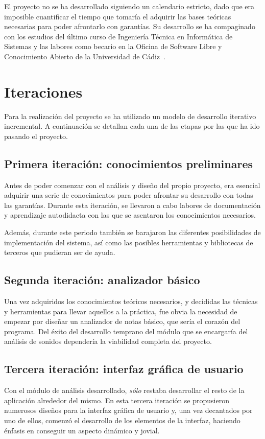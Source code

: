 El proyecto no se ha desarrollado siguiendo un calendario estricto,
dado que era imposible cuantificar el tiempo que tomaría el adquirir
las bases teóricas necesarias para poder afrontarlo con garantías. Su
desarrollo se ha compaginado con los estudios del último curso de
Ingeniería Técnica en Informática de Sistemas y las labores como
becario en la Oficina de Software Libre y Conocimiento Abierto de la
Universidad de Cádiz~\cite{osluca}.

\section{Iteraciones}
Para la realización del proyecto se ha utilizado un modelo de
desarrollo iterativo incremental. A continuación se detallan cada una
de las etapas por las que ha ido pasando el proyecto.

\subsection{Primera iteración: conocimientos preliminares}
Antes de poder comenzar con el análisis y diseño del propio proyecto,
era esencial adquirir una serie de conocimientos para poder afrontar
su desarrollo con todas las garantías. Durante esta iteración, se
llevaron a cabo labores de documentación y aprendizaje autodidacta con
las que se asentaron los conocimientos necesarios.

Además, durante este periodo también se barajaron las diferentes
posibilidades de implementación del sistema, así como las posibles
herramientas y bibliotecas de terceros que pudieran ser de ayuda.

\subsection{Segunda iteración: analizador básico}
Una vez adquiridos los conocimientos teóricos necesarios, y decididas
las técnicas y herramientas para llevar aquellos a la práctica, fue
obvia la necesidad de empezar por diseñar un analizador de notas
básico, que sería el corazón del programa. Del éxito del desarrollo
temprano del módulo que se encargaría del análisis de sonidos
dependería la viabilidad completa del proyecto.

\subsection{Tercera iteración: interfaz gráfica de usuario}
Con el módulo de análisis desarrollado, \textit{sólo} restaba
desarrollar el resto de la aplicación alrededor del mismo. En esta
tercera iteración se propusieron numerosos diseños para la interfaz
gráfica de usuario y, una vez decantados por uno de ellos, comenzó el
desarrollo de los elementos de la interfaz, haciendo énfasis en
conseguir un aspecto dinámico y jovial.

